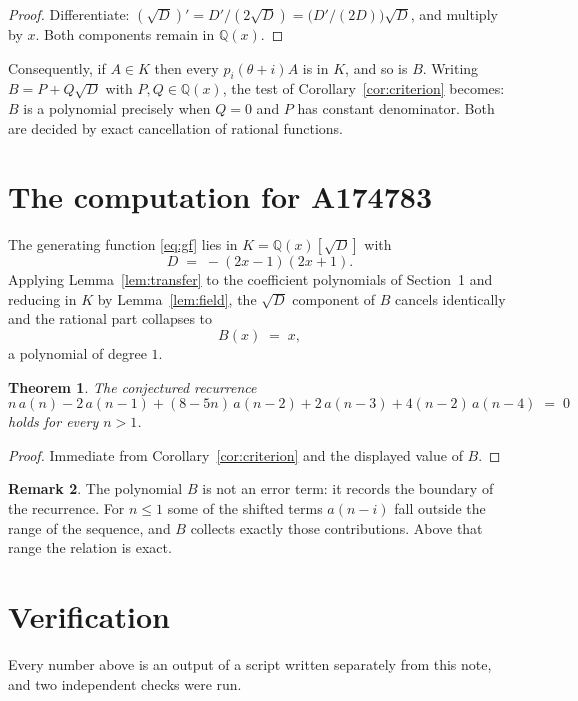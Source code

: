 \documentclass[11pt,a4paper]{article}
\theoremstyle{plain}
\newtheorem{theorem}{Theorem}
\theoremstyle{definition}
\newtheorem{remark}[theorem]{Remark}
\begin{document}
\begin{proof}
Differentiate: $(\sqrt{D})'=D'/(2\sqrt{D})=\bigl(D'/(2D)\bigr)\sqrt{D}$, and multiply by
$x$. Both components remain in $\mathbb{Q}(x)$.
\end{proof}

Consequently, if $A\in K$ then every $p_{i}(\theta+i)A$ is in $K$, and so is $B$. Writing
$B=P+Q\sqrt{D}$ with $P,Q\in\mathbb{Q}(x)$, the test of Corollary~\ref{cor:criterion}
becomes: $B$ is a polynomial precisely when $Q=0$ and $P$ has constant denominator. Both
are decided by exact cancellation of rational functions.

\section{The computation for A174783}

The generating function \eqref{eq:gf} lies in $K=\mathbb{Q}(x)[\sqrt{D}]$ with
\[
D \;=\; - \left(2 x - 1\right) \left(2 x + 1\right) .
\]
Applying Lemma~\ref{lem:transfer} to the coefficient polynomials of Section~1 and reducing
in $K$ by Lemma~\ref{lem:field}, the $\sqrt{D}$ component of $B$ cancels identically and
the rational part collapses to
\[
B(x)\;=\;x ,
\]
a polynomial of degree $1$.

\begin{theorem}
The conjectured recurrence
\[
n\,a(n) - 2\,a(n-1) + (8 - 5 n)\,a(n-2) + 2\,a(n-3) + 4 \left(n - 2\right)\,a(n-4) \;=\;0
\]
holds for every $n>1$.
\end{theorem}

\begin{proof}
Immediate from Corollary~\ref{cor:criterion} and the displayed value of $B$.
\end{proof}

\begin{remark}
The polynomial $B$ is not an error term: it records the boundary of the recurrence. For
$n\le1$ some of the shifted terms $a(n-i)$ fall outside the range of the sequence,
and $B$ collects exactly those contributions. Above that range the relation is exact.
\end{remark}

\section{Verification}

Every number above is an output of a script written separately from this note, and two
independent checks were run.
\end{document}
